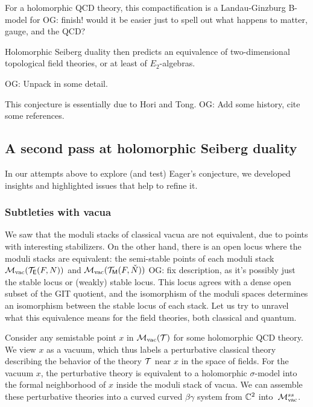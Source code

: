 \documentclass[11pt]{amsart}
\def\owen#1{{\textcolor{violet!65!black}{OG: {#1}}}}
\begin{document}
\begin{lem}
For a holomorphic QCD theory, this compactification is a Landau-Ginzburg B-model for \owen{finish! would it be easier just to spell out what happens to matter, gauge, and the QCD?}
\end{lem}

Holomorphic Seiberg duality then predicts an equivalence of two-dimensional topological field theories,
or at least of $E_2$-algebras.

\begin{conj}
\owen{Unpack in some detail.}
\end{conj}

This conjecture is essentially due to Hori and Tong. \owen{Add some history, cite some references.}

\subsection{A second pass at holomorphic Seiberg duality}

In our attempts above to explore (and test) Eager's conjecture, we developed insights and highlighted issues that help to refine it.
 
\subsubsection{Subtleties with vacua}

We saw that the moduli stacks of classical vacua are not equivalent, due to points with interesting stabilizers.
On the other hand, there is an open locus where the moduli stacks are equivalent:
the semi-stable points of each moduli stack $\mathcal M_{\rm vac}(\mathcal T_{\mathsf E}(F,N))$ and $\mathcal M_{\rm vac}(\mathcal T_{{\sf M}}(F,\check{N}))$ \owen{fix description, as it's possibly just the stable locus or (weakly) stable locus}.
This locus agrees with a dense open subset of the GIT quotient, 
and the isomorphism of the moduli spaces determines an isomorphism between the stable locus of each stack.
Let us try to unravel what this equivalence means for the field theories, both classical and quantum.

Consider any semistable point $x$ in $\mathcal M_{\rm vac}(\mathcal T)$ for some holomorphic QCD theory.
We view $x$ as a vacuum, which thus labels a perturbative classical theory describing the behavior of the theory $\mathcal T$ near $x$ in the space of fields. 
For the vacuum $x$, the perturbative theory is equivalent to a holomorphic $\sigma$-model into the formal neighborhood of $x$ inside the moduli stack of vacua. 
We can assemble these perturbative theories into a curved curved $\beta\gamma$ system from $\mathbb C^2$ into~$\mathcal M_{\rm vac}^{ss}$.
\end{document}
